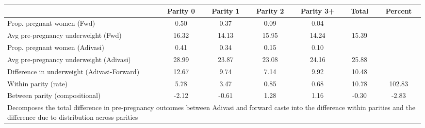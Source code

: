 \begin{tabular}{l*{6}{c}}
\toprule
            &\multicolumn{1}{c}{Parity 0}&\multicolumn{1}{c}{Parity 1}&\multicolumn{1}{c}{Parity 2}&\multicolumn{1}{c}{Parity 3+}&\multicolumn{1}{c}{Total}&\multicolumn{1}{c}{Percent}\\
\midrule
\midrule
Prop. pregnant women (Fwd)&        0.50&        0.37&        0.09&        0.04&            &            \\
Avg pre-pregnancy underweight (Fwd)&       16.32&       14.13&       15.95&       14.24&       15.39&            \\
Prop. pregnant women (Adivasi)&        0.41&        0.34&        0.15&        0.10&            &            \\
Avg pre-pregnancy underweight (Adivasi)&       28.99&       23.87&       23.08&       24.16&       25.88&            \\
Difference in underweight (Adivasi-Forward)&       12.67&        9.74&        7.14&        9.92&       10.48&            \\
Within parity (rate)&        5.78&        3.47&        0.85&        0.68&       10.78&      102.83\\
Between parity (compositional)&       -2.12&       -0.61&        1.28&        1.16&       -0.30&       -2.83\\
\bottomrule
\multicolumn{7}{l}{\footnotesize Decomposes the total difference in pre-pregnancy outcomes between Adivasi and forward caste into the difference within parities and the difference due to distribution across parities}\\
\end{tabular}
